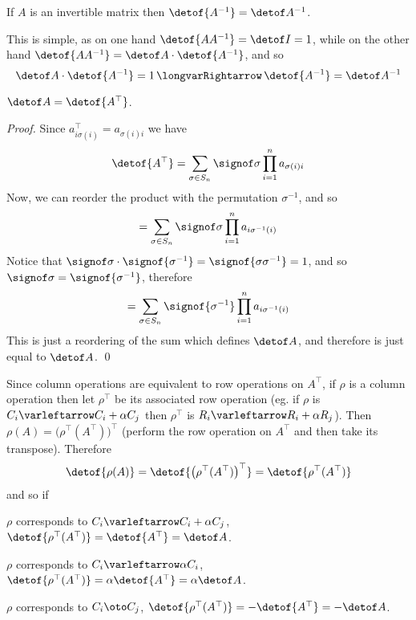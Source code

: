 \begin{coro*}

    If $A$ is an invertible matrix then $\detof{A^{-1}}=\detof A^{-1}$.

\end{coro*}

This is simple, as on one hand $\detof{AA^{-1}}=\detof I=1$, while on the other hand $\detof{AA^{-1}}=\detof A\cdot\detof{A^{-1}}$, and so
\[ \detof A\cdot\detof{A^{-1}} = 1 \implies \detof{A^{-1}} = \detof A^{-1} \]

\begin{prop*}

    $\detof A=\detof{A^\top}$.

\end{prop*}

\begin{proof}

    Since $a^\top_{i\sigma(i)}=a_{\sigma(i)i}$ we have
    \[ \detof{A^\top} = \sum_{\sigma\in S_n}\signof\sigma\prod_{i=1}^n a_{\sigma(i)i} \]
    Now, we can reorder the product with the permutation $\sigma^{-1}$, and so
    \[ = \sum_{\sigma\in S_n}\signof\sigma\prod_{i=1}^n a_{i\sigma^{-1}(i)} \]
    Notice that $\signof\sigma\cdot\signof{\sigma^{-1}}=\signof{\sigma\sigma^{-1}}=1$, and so $\signof\sigma=\signof{\sigma^{-1}}$, therefore
    \[ = \sum_{\sigma\in S_n}\signof{\sigma^{-1}}\prod_{i=1}^n a_{i\sigma^{-1}(i)} \]
    This is just a reordering of the sum which defines $\detof A$, and therefore is just equal to $\detof A$.
    \qed

\end{proof}

Since column operations are equivalent to row operations on $A^\top$, if $\rho$ is a column operation then let $\rho^\top$ be its associated row operation (eg. if $\rho$ is $C_i\varleftarrow C_i+\alpha C_j$
then $\rho^\top$ is $R_i\varleftarrow R_i+\alpha R_j$).
Then $\rho(A)=\bigl(\rho^\top(A^\top)\bigr)^\top$ (perform the row operation on $A^\top$ and then take its transpose).
Therefore
\[ \detof{\rho(A)} = \detof{\bigl(\rho^\top(A^\top)\bigr)^\top} = \detof{\rho^\top(A^\top)} \]
and so if
\blist
    \item $\rho$ corresponds to $C_i\varleftarrow C_i+\alpha C_j$, $\detof{\rho^\top(A^\top)}=\detof{A^\top}=\detof A$.
    \item $\rho$ corresponds to $C_i\varleftarrow\alpha C_i$, $\detof{\rho^\top(A^\top)}=\alpha\detof{A^\top}=\alpha\detof A$.
    \item $\rho$ corresponds to $C_i\oto C_j$, $\detof{\rho^\top(A^\top)}=-\detof{A^\top}=-\detof A$.
\elist

